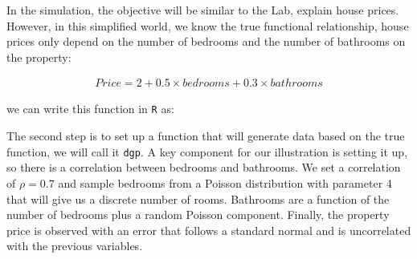 In the simulation, the objective will be similar to the Lab, explain
house prices. However, in this simplified world, we know the true
functional relationship, house prices only depend on the number of
bedrooms and the number of bathrooms on the property:

\begin{align}\label{eq:true_f}
Price = 2 + 0.5 \times bedrooms+ 0.3 \times bathrooms
\end{align}

we can write this function in \texttt{R} as:

\begin{Shaded}
\begin{Highlighting}[]
\StringTok{ }
\StringTok{ } \OperatorTok{+}\StringTok{ }\OperatorTok{*}\OperatorTok{+}\StringTok{ }\OperatorTok{*}
\NormalTok{\}}
\end{Highlighting}
\end{Shaded}

The second step is to set up a function that will generate data based on
the true function, we will call it \texttt{dgp}. A key component for our
illustration is setting it up, so there is a correlation between
bedrooms and bathrooms. We set a correlation of \(\rho=0.7\) and sample
bedrooms from a Poisson distribution with parameter 4 that will give us
a discrete number of rooms. Bathrooms are a function of the number of
bedrooms plus a random Poisson component. Finally, the property price is
observed with an error that follows a standard normal and is
uncorrelated with the previous variables.

\begin{Shaded}
\begin{Highlighting}[]
\NormalTok{)  }
\StringTok{ }\OperatorTok{*}\OperatorTok{+}\StringTok{ }\NormalTok{)) }
\NormalTok{, }\NormalTok{) }
\StringTok{ }\OperatorTok{+}\StringTok{ }
\StringTok{ }
\NormalTok{\}}
\end{Highlighting}
\end{Shaded}

